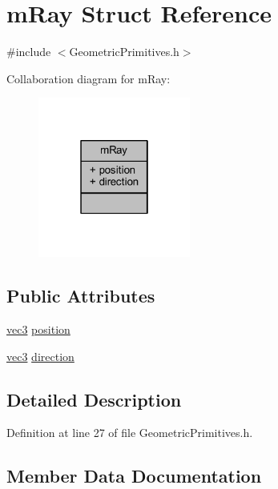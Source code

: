 \hypertarget{structm_ray}{}\section{m\+Ray Struct Reference}
\label{structm_ray}


{\ttfamily \#include $<$Geometric\+Primitives.\+h$>$}



Collaboration diagram for m\+Ray\+:\nopagebreak
\begin{figure}[H]
\begin{center}
\leavevmode
\includegraphics[width=142pt]{structm_ray__coll__graph}
\end{center}
\end{figure}
\subsection*{Public Attributes}
\begin{DoxyCompactItemize}
\item 
\hyperlink{_types_8h_a3d0ce73e3199de81565fb01632415288}{vec3} \hyperlink{structm_ray_a3a3743f095755755300b5a0431fb8ae4}{position}
\item 
\hyperlink{_types_8h_a3d0ce73e3199de81565fb01632415288}{vec3} \hyperlink{structm_ray_ad73b22665f6e491662e6699271a2a501}{direction}
\end{DoxyCompactItemize}


\subsection{Detailed Description}


Definition at line 27 of file Geometric\+Primitives.\+h.



\subsection{Member Data Documentation}
